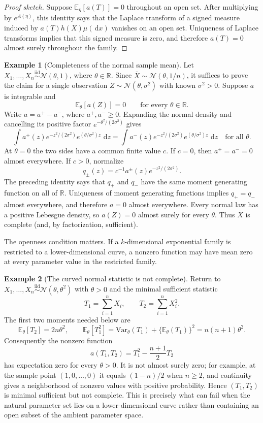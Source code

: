 \documentclass[12pt,oneside]{book}
\numberwithin{equation}{section}
\theoremstyle{definition}
\newtheorem{example}{Example}[section]
\theoremstyle{plain}
\theoremstyle{remark}
\newcommand{\R}{\mathbb{R}}
\newcommand{\E}{\mathbb{E}}
\newcommand{\Var}{\mathrm{Var}}
\newcommand{\iid}{\overset{\text{iid}}{\sim}}
\newcommand{\dd}{\,\mathrm{d}}
\newcommand{\Normal}{\mathcal{N}}
\begin{document}
\begin{proof}[Proof sketch]
Suppose $\E_\eta[a(T)]=0$ throughout an open set.  After multiplying by
$e^{A(\eta)}$, this identity says that the Laplace transform of a signed
measure induced by $a(T)h(X)\mu(\dd x)$ vanishes on an open set.  Uniqueness
of Laplace transforms implies that this signed measure is zero, and therefore
$a(T)=0$ almost surely throughout the family.
\end{proof}

\begin{example}[Completeness of the normal sample mean]
Let $X_1,\ldots,X_n\iid\Normal(\theta,1)$, where $\theta\in\R$.  Since
$\bar X\sim\Normal(\theta,1/n)$, it suffices to prove the claim for a single
observation $Z\sim\Normal(\theta,\sigma^2)$ with known $\sigma^2>0$.
Suppose $a$ is integrable and
\[
    \E_\theta[a(Z)]=0
    \qquad\text{for every }\theta\in\R.
\]
Write $a=a^+-a^-$, where $a^+,a^-\geq0$.  Expanding the normal density and
cancelling its positive factor $e^{-\theta^2/(2\sigma^2)}$ gives
\[
 \int a^+(z)e^{-z^2/(2\sigma^2)}e^{(\theta/\sigma^2)z}\,\dd z
 =
 \int a^-(z)e^{-z^2/(2\sigma^2)}e^{(\theta/\sigma^2)z}\,\dd z
 \quad\text{for all }\theta.
\]
At $\theta=0$ the two sides have a common finite value $c$.  If $c=0$, then
$a^+=a^-=0$ almost everywhere.  If $c>0$, normalize
\[
 q_\pm(z)=c^{-1}a^\pm(z)e^{-z^2/(2\sigma^2)}.
\]
The preceding identity says that $q_+$ and $q_-$ have the same moment
generating function on all of $\R$.  Uniqueness of moment generating
functions implies $q_+=q_-$ almost everywhere, and therefore $a=0$ almost
everywhere.  Every normal law has a positive Lebesgue density, so
$a(Z)=0$ almost surely for every $\theta$.  Thus $\bar X$ is complete (and,
by factorization, sufficient).
\end{example}

The openness condition matters.  If a $k$-dimensional exponential family is
restricted to a lower-dimensional curve, a nonzero function may have mean
zero at every parameter value in the restricted family.

\begin{example}[The curved normal statistic is not complete]
Return to $X_1,\ldots,X_n\iid\Normal(\theta,\theta^2)$ with $\theta>0$ and
the minimal sufficient statistic
\[
 T_1=\sum_{i=1}^nX_i,
 \qquad
 T_2=\sum_{i=1}^nX_i^2.
\]
The first two moments needed below are
\[
 \E_\theta[T_2]=2n\theta^2,
 \qquad
 \E_\theta[T_1^2]
 =\Var_\theta(T_1)+\{\E_\theta(T_1)\}^2
 =n(n+1)\theta^2.
\]
Consequently the nonzero function
\[
 a(T_1,T_2)=T_1^2-\frac{n+1}{2}T_2
\]
has expectation zero for every $\theta>0$.  It is not almost surely zero;
for example, at the sample point $(1,0,\ldots,0)$ it equals $(1-n)/2$ when
$n\geq2$, and continuity gives a neighborhood of nonzero values with
positive probability.  Hence $(T_1,T_2)$ is minimal sufficient but not
complete.  This is precisely what can fail when the natural parameter set
lies on a lower-dimensional curve rather than containing an open subset of
the ambient parameter space.
\end{example}
\end{document}
